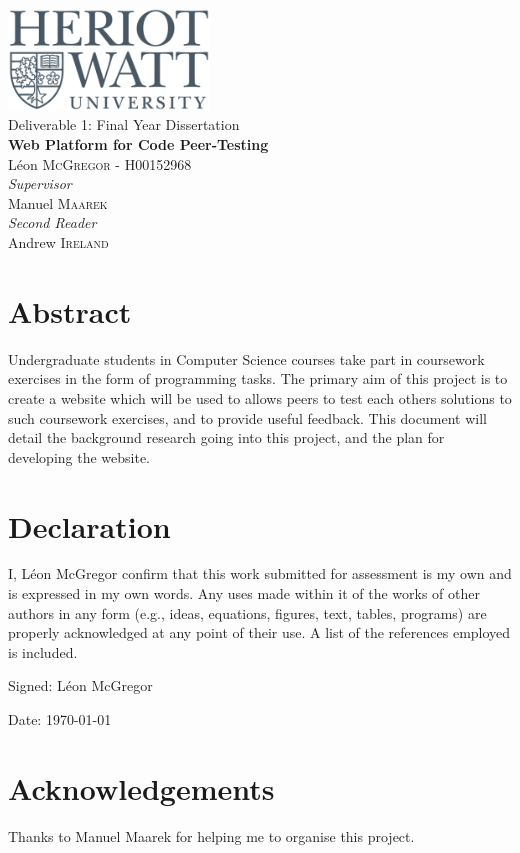 \documentclass[a4paper,11pt]{report}
\newcommand{\titles}{\\\vspace{1cm}}
\begin{document}
\pagestyle{empty}

{\centering\Large
\includegraphics[width=0.4\textwidth]{../hwu.png}\titles
Deliverable 1: Final Year Dissertation\titles
{\huge\bfseries Web Platform for Code Peer-Testing\titles}
L\'eon \textsc{McGregor} - H00152968\titles
{\large\textit{Supervisor}\\}
Manuel \textsc{Maarek}\titles
{\large\textit{Second Reader}\\}
Andrew \textsc{Ireland}\\
\vfill
}

\newpage
{
  \renewcommand{\thispagestyle}[1]{}
  \tableofcontents
}
\newpage
\doublespacing


\section*{Abstract}
Undergraduate students in Computer Science courses take part in coursework exercises in the form of programming tasks. The primary aim of this project is to create a website which will be used to allows peers to test each others solutions to such coursework exercises, and to provide useful feedback. This document will detail the background research going into this project, and the plan for developing the website.

\vfill

\section*{Declaration}
I, L\'eon McGregor confirm that this work submitted for assessment is my own and is expressed in my own words. Any uses made within it of the works of other authors in any form (e.g., ideas, equations, figures, text, tables, programs) are properly acknowledged at any point of their use. A list of the references employed is included.\par
Signed: L\'eon McGregor\par
Date: \today

\vfill

\section*{Acknowledgements}
Thanks to Manuel Maarek for helping me to organise this project.
\end{document}

